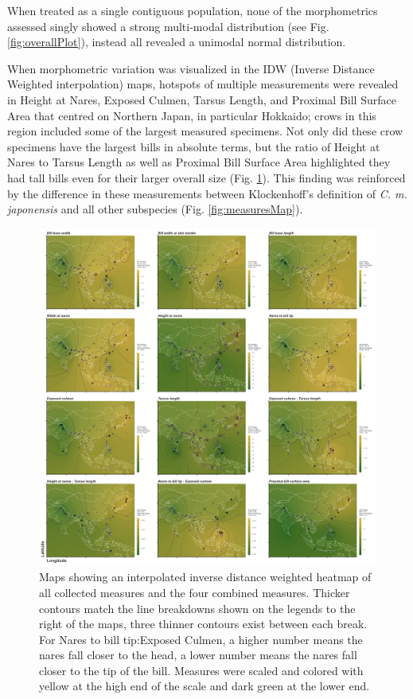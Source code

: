\documentclass[10pt,a4paper]{article}
\begin{document}
When treated as a single contiguous population, none of the morphometrics assessed singly showed a strong multi-modal distribution (see Fig. \ref{fig:overallPlot}), instead all revealed a unimodal normal distribution.

When morphometric variation was visualized in the IDW (Inverse Distance Weighted interpolation) maps, hotspots of multiple measurements were revealed in Height at Nares, Exposed Culmen, Tarsus Length, and Proximal Bill Surface Area that centred on Northern Japan, in particular Hokkaido; crows in this region included some of the largest measured specimens.
Not only did these crow specimens have the largest bills in absolute terms, but the ratio of Height at Nares to Tarsus Length as well as Proximal Bill Surface Area highlighted they had tall bills even for their larger overall size (Fig. \ref{fig:idwMaps}).
This finding was reinforced by the difference in these measurements between Klockenhoff's definition of \emph{C. m. japonensis} and all other subspecies (Fig. \ref{fig:measuresMap}).

\begin{figure}
\includegraphics[width=0.9\linewidth]{../Figures/IDWmaps} \caption{Maps showing an interpolated inverse distance weighted heatmap of all collected measures and the four combined measures. Thicker contours match the line breakdowns shown on the legends to the right of the maps, three thinner contours exist between each break. For Nares to bill tip:Exposed Culmen, a higher number means the nares fall closer to the head, a lower number means the nares fall closer to the tip of the bill. Measures were scaled and colored with yellow at the high end of the scale and dark green at the lower end.}\label{fig:idwMaps}
\end{figure}
\end{document}

